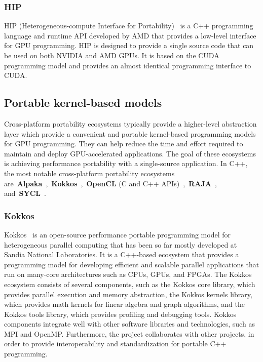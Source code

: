 \subsubsection{HIP}


\par
HIP (Heterogeneous-compute Interface for Portability)~\cite{hip} is a C++ programming language and runtime API developed by AMD that provides a low-level interface for GPU programming.
HIP is designed to provide a single source code that can be used on both NVIDIA and AMD GPUs.
It is based on the CUDA programming model and provides an almost identical programming interface to CUDA.




\subsection{Portable kernel-based models}

\par
Cross-platform portability ecosystems typically provide a higher-level abstraction layer which provide a convenient and portable kernel-based programming models for GPU programming.
They can help reduce the time and effort required to maintain and deploy GPU-accelerated applications.
The goal of these ecosystems is achieving performance portability with a single-source application.
In C++, the most notable cross-platform portability ecosystems are~\textbf{Alpaka}~\cite{alpaka},~\textbf{Kokkos}~\cite{kokkos},~\textbf{OpenCL} (C and C++ APIs)~\cite{OpenCL},~\textbf{RAJA}~\cite{raja}, and~\textbf{SYCL}~\cite{sycl}.


\subsubsection{Kokkos}


\par
Kokkos~\cite{kokkos} is an open-source performance portable programming model for heterogeneous parallel computing that has been so far mostly developed at Sandia National Laboratories.
It is a C++-based ecosystem that provides a programming model for developing efficient and scalable parallel applications that run on many-core architectures such as CPUs, GPUs, and FPGAs.
The Kokkos ecosystem consists of several components, such as the Kokkos core library, which provides parallel execution and memory abstraction, the Kokkos kernels library, which provides math kernels for linear algebra and graph algorithms, and the Kokkos tools library, which provides profiling and debugging tools.
Kokkos components integrate well with other software libraries and technologies, such as MPI and OpenMP. 
Furthermore, the project collaborates with other projects, in order to provide interoperability and standardization for portable C++ programming.


